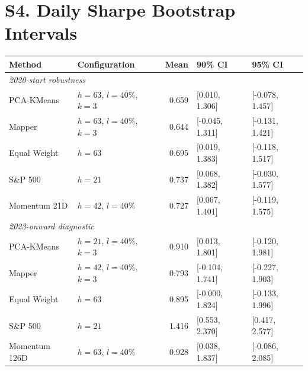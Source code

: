 \documentclass[10pt]{article}
\begin{document}
\section*{S4. Daily Sharpe Bootstrap Intervals}
\begin{table}[h]
\centering
\small
\begin{tabular}{llrll}
\toprule
Method & Configuration & Mean & 90\% CI & 95\% CI \\
\midrule
\multicolumn{5}{l}{\textit{2020-start robustness}} \\
PCA-KMeans & $h=63$, $l=40\%$, $k=3$ & 0.659 & [0.010, 1.306] & [-0.078, 1.457] \\
Mapper & $h=63$, $l=40\%$, $k=3$ & 0.644 & [-0.045, 1.311] & [-0.131, 1.421] \\
Equal Weight & $h=63$ & 0.695 & [0.019, 1.383] & [-0.118, 1.517] \\
S\&P 500 & $h=21$ & 0.737 & [0.068, 1.382] & [-0.030, 1.577] \\
Momentum 21D & $h=42$, $l=40\%$ & 0.727 & [0.067, 1.401] & [-0.119, 1.575] \\
\midrule
\multicolumn{5}{l}{\textit{2023-onward diagnostic}} \\
PCA-KMeans & $h=21$, $l=40\%$, $k=3$ & 0.910 & [0.013, 1.801] & [-0.120, 1.981] \\
Mapper & $h=42$, $l=40\%$, $k=3$ & 0.793 & [-0.104, 1.741] & [-0.227, 1.903] \\
Equal Weight & $h=63$ & 0.895 & [-0.000, 1.824] & [-0.133, 1.996] \\
S\&P 500 & $h=21$ & 1.416 & [0.553, 2.370] & [0.417, 2.577] \\
Momentum 126D & $h=63$, $l=40\%$ & 0.928 & [0.038, 1.837] & [-0.086, 2.085] \\
\bottomrule
\end{tabular}
\end{table}
\end{document}
